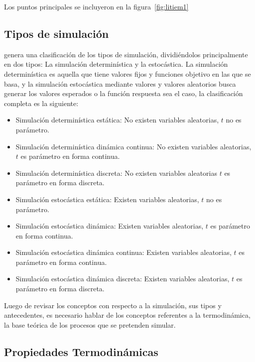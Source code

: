 Los puntos principales se incluyeron en la figura~\ref{fig:litiem1}




\subsection{Tipos de simulación}

\textcite{sachin1} genera una clasificación de los tipos de simulación, dividiéndolos principalmente en dos tipos: La simulación determinística y la estocástica. La simulación determinística es aquella que tiene valores fijos y funciones objetivo en las que se basa, y la simulación estocástica mediante valores y valores aleatorios busca generar los valores esperados o la función respuesta sea el caso, la clasificación completa es la siguiente:

\begin{itemize}
    \item Simulación determinística estática: No existen variables aleatorias, \( t \) no es parámetro.
    \item Simulación determinística dinámica continua: No existen variables aleatorias, \( t \) es parámetro en forma continua.
    \item Simulación determinística discreta: No existen variables aleatorias \( t \) es parámetro en forma discreta.
    \item Simulación estocástica estática: Existen variables aleatorias, \( t \) no es parámetro.
    \item Simulación estocástica dinámica: Existen variables aleatorias, \( t \) es parámetro en forma continua. 
    \item Simulación estocástica dinámica continua: Existen variables aleatorias, \( t \) es parámetro en forma continua.  
    \item Simulación estocástica dinámica discreta: Existen variables aleatorias, \( t \) es parámetro en forma discreta. 
\end{itemize}



Luego de revisar los conceptos con respecto a la simulación, sus tipos y antecedentes, es necesario hablar de los conceptos referentes a la termodinámica, la base teórica de los procesos que se pretenden simular.

\subsection{Propiedades Termodinámicas}

